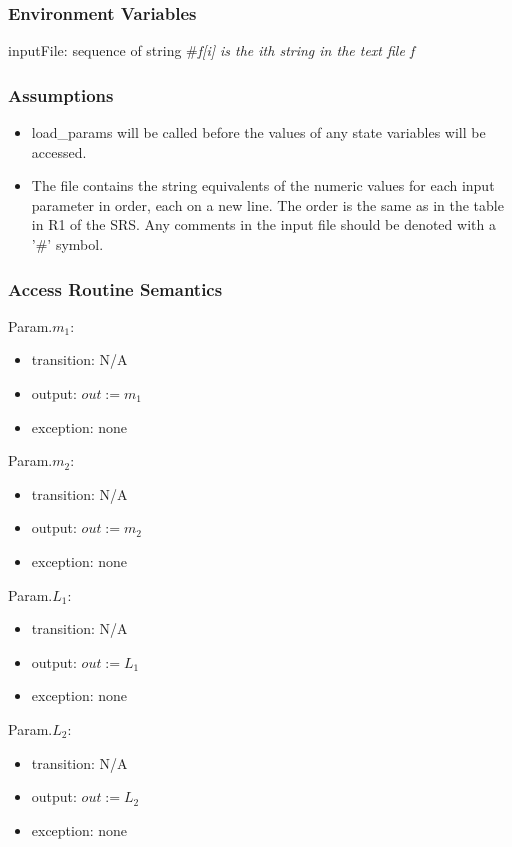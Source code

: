 \documentclass[12pt, titlepage]{article}
\begin{document}
\subsubsection{Environment Variables}
inputFile: sequence of string \#\textit{f[i] is the ith string in the text file f}\\ 
\subsubsection{Assumptions}
\begin{itemize}
\item load\_params will be called before the values of any state variables will be accessed.

\item The file contains the string equivalents of the numeric values for
each input parameter in order, each on a new line. The order is the same as in
the table in R1 of the SRS. Any comments in the input file should be denoted
with a '\#' symbol.
\end{itemize}
\subsubsection{Access Routine Semantics}

\noindent Param.$m_1$:
\begin{itemize}
\item transition: N/A
\item output: $out := m_1$
\item exception: none
\end{itemize}

\noindent Param.$m_2$:
\begin{itemize}
\item transition: N/A
\item output: $out := m_2$
\item exception: none
\end{itemize}

\noindent Param.$L_1$:
\begin{itemize}
\item transition: N/A
\item output: $out := L_1$
\item exception: none
\end{itemize}

\noindent Param.$L_2$:
\begin{itemize}
\item transition: N/A
\item output: $out := L_2$
\item exception: none
\end{itemize}
\end{document}
